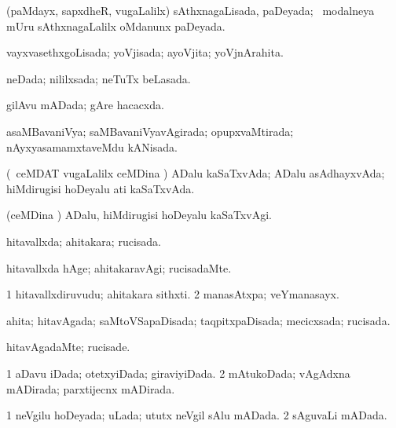 {{\bentry
{} 
\gl{\gu}
\expl{}
\bmng
(paMdayx, sapxdheR, \mo vugaLalilx) sAthxnagaLisada, paDeyada; \kanmu\ modalneya mUru sAthxnagaLalilx oMdanunx paDeyada. 
\emng
\eentry

\bentry
{} 
\gl{\gu}
\expl{}
\bmng
vayxvasethxgoLisada; yoVjisada; ayoVjita; yoVjnArahita. 
\emng
\eentry

\bentry
{} 
\gl{\gu}
\expl{}
\bmng
neDada; nililxsada; neTuTx beLasada. 
\emng
\eentry

\bentry
{} 
\gl{\gu}
\expl{}
\bmng
gilAvu mADada; gAre hacacxda. 
\emng
\eentry

\bentry
{} 
\gl{\gu}
\expl{}
\bmng
asaMBavaniVya; saMBavaniVyavAgirada; opupxvaMtirada; nAyxyasamamxtaveMdu kANisada. 
\emng
\eentry

\bentry
{} 
\gl{\gu}
\expl{}
\bmng
(\kanmu\ ceMDAT \mo vugaLalilx ceMDina \vi) ADalu kaSaTxvAda; ADalu asAdhayxvAda; hiMdirugisi hoDeyalu ati kaSaTxvAda. 
\emng
\eentry

\bentry
{} 
\gl{\kirxvi}
\expl{}
\bmng
(ceMDina \vi) ADalu, hiMdirugisi hoDeyalu kaSaTxvAgi. 
\emng
\eentry

\bentry
{} 
\gl{\gu}
\expl{}
\bmng
hitavallxda; ahitakara; rucisada. 
\emng
\eentry

\bentry
{} 
\gl{\kirxvi}
\expl{}
\bmng
hitavallxda hAge; ahitakaravAgi; rucisadaMte. 
\emng
\eentry

\bentry
{} 
\gl{\nA}
\expl{}
\bmng
\bnum
\num{1} hitavallxdiruvudu; ahitakara sithxti. 
\num{2} manasAtxpa; veYmanasayx. 
\enum
\emng
\eentry

\bentry
{} 
\gl{\gu}
\expl{}
\bmng
ahita; hitavAgada; saMtoVSapaDisada; taqpitxpaDisada; mecicxsada; rucisada. 
\emng
\eentry

\bentry
{} 
\gl{\kirxvi}
\expl{}
\bmng
hitavAgadaMte; rucisade. 
\emng
\eentry

\bentry
{} 
\gl{\gu}
\expl{}
\bmng
\bnum
\num{1} aDavu iDada; otetxyiDada; giraviyiDada. 
\num{2} mAtukoDada; vAgAdxna mADirada; parxtijecnx mADirada. 
\enum
\emng
\eentry

\bentry
{} 
\gl{\gu}
\expl{}
\bmng
\bnum
\num{1} neVgilu hoDeyada; uLada; ututx neVgil sAlu mADada. 
\num{2} sAguvaLi mADada. 
\enum
\emng
\eentry

}}
